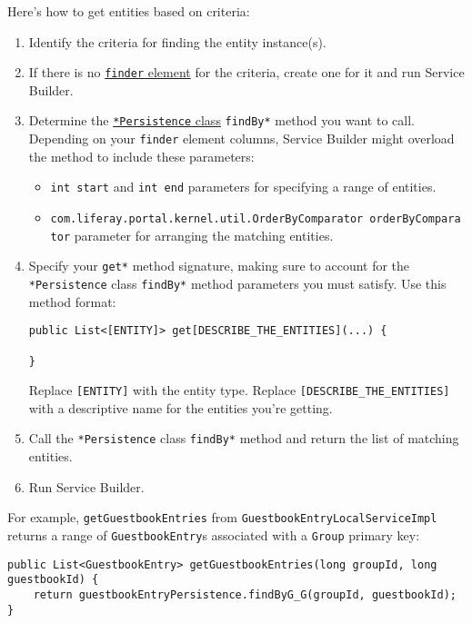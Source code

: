 Here's how to get entities based on criteria:

\begin{enumerate}
\def\labelenumi{\arabic{enumi}.}
\item
  Identify the criteria for finding the entity instance(s).
\item
  If there is no
  \href{/docs/7-2/appdev/-/knowledge_base/a/defining-service-entity-finder-methods}{\texttt{finder}
  element} for the criteria, create one for it and run Service Builder.
\item
  Determine the
  \href{/docs/7-2/appdev/-/knowledge_base/a/understanding-the-code-generated-by-service-builder}{\texttt{*Persistence}
  class} \texttt{findBy*} method you want to call. Depending on your
  \texttt{finder} element columns, Service Builder might overload the
  method to include these parameters:

  \begin{itemize}
  \tightlist
  \item
    \texttt{int\ start} and \texttt{int\ end} parameters for specifying
    a range of entities.
  \item
    \texttt{com.liferay.portal.kernel.util.OrderByComparator\ orderByComparator}
    parameter for arranging the matching entities.
  \end{itemize}
\item
  Specify your \texttt{get*} method signature, making sure to account
  for the \texttt{*Persistence} class \texttt{findBy*} method parameters
  you must satisfy. Use this method format:

\begin{verbatim}
public List<[ENTITY]> get[DESCRIBE_THE_ENTITIES](...) {

}
\end{verbatim}

  Replace \texttt{{[}ENTITY{]}} with the entity type. Replace
  \texttt{{[}DESCRIBE\_THE\_ENTITIES{]}} with a descriptive name for the
  entities you're getting.
\item
  Call the \texttt{*Persistence} class \texttt{findBy*} method and
  return the list of matching entities.
\item
  Run Service Builder.
\end{enumerate}

For example, \texttt{getGuestbookEntries} from
\texttt{GuestbookEntryLocalServiceImpl} returns a range of
\texttt{GuestbookEntry}s associated with a \texttt{Group} primary key:

\begin{verbatim}
public List<GuestbookEntry> getGuestbookEntries(long groupId, long guestbookId) {
    return guestbookEntryPersistence.findByG_G(groupId, guestbookId);
}
\end{verbatim}

